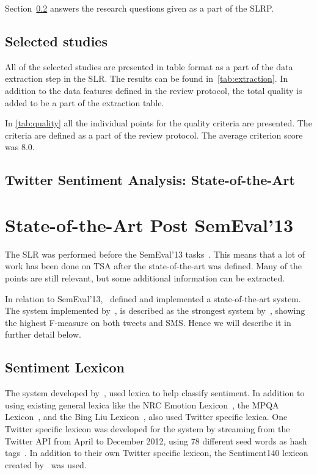 Section~\ref{sec:stateofart} answers the research questions given as a part of the SLRP. 

\subsection{Selected studies} 
\label{sec:selected}

All of the selected studies are presented in table format as a part of the data extraction step in the SLR. The results can be found in~\autoref{tab:extraction}. In addition to the data features defined in the review protocol, the total quality is added to be a part of the extraction table.



In \autoref{tab:quality} all the individual points for the quality criteria are presented. The criteria are defined as a part of the review protocol. The average criterion score was 8.0.



\subsection{Twitter Sentiment Analysis: State-of-the-Art}
\label{sec:stateofart}


\section{State-of-the-Art Post SemEval'13}\label{sec:stateofart_post}
The SLR was performed before the SemEval'13 tasks~\citep{WilsonEA:13}. This means that a lot of work has been done on TSA after the state-of-the-art was defined. Many of the points are still relevant, but some additional information can be extracted. 

In relation to SemEval'13,~\cite{MohammadEA:13} defined and implemented a state-of-the-art system. The system implemented by~\cite{MohammadEA:13}, is described as the strongest system by~\cite{WilsonEA:13}, showing the highest F-measure on both tweets and SMS. Hence we will describe it in further detail below.

\subsection{Sentiment Lexicon}\label{sec:nrc-lexicon}
The system developed by~\cite{MohammadEA:13}, used lexica to help classify sentiment. In addition to using existing general lexica like the NRC Emotion Lexicon~\citep{mohammad2010emotions, mohammad2011tracking}, the MPQA Lexicon~\citep{wilson2005recognizing}, and the Bing Liu Lexicon~\citep{hu2004mining}, \cite{MohammadEA:13} also used Twitter specific lexica. One Twitter specific lexicon was developed for the system by streaming from the Twitter API from April to December 2012, using 78 different seed words as hash tags~\citep{MohammadEA:13}. In addition to their own Twitter specific lexicon, the Sentiment140 lexicon created by~\cite{article:go} was used.

